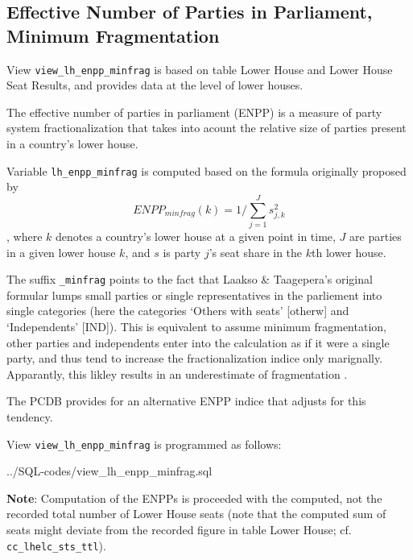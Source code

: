 \subsection{Effective Number of Parties in Parliament, Minimum Fragmentation}\label{view_lh_enpp_minfrag}
View \texttt{\footnotesize view\_lh\_enpp\_minfrag} is based on table Lower House and Lower House Seat Results, and provides data at the level of lower houses.

The effective number of parties in parliament (ENPP) is a measure of party system fractionalization that takes into acount the relative size of parties present in a country's lower house. 

Variable \texttt{\footnotesize lh\_enpp\_minfrag} is computed based on the formula originally proposed by \citet{Laakso&Taagepera1979}
\begin{equation}\label{ENPP_equ_minfrag}
ENPP_{minfrag}(k) = 1/\sum\limits_{j=1}^{J}s_{j,k}^{2}
\end{equation}
, where $k$ denotes a country's lower house at a given point in time, $J$ are parties in a given lower house $k$, and $s$ is party $j$'s seat share in the $k$th lower house. 

The suffix \texttt{\footnotesize \_minfrag} points to the fact that Laakso \& Taagepera's original formular lumps small parties or single representatives in the parliement into single categories (here the categories `Others with seats' [otherw] and `Independents' [IND]). 
This is equivalent to assume minimum fragmentation, other parties and independents enter into the calculation as if it were a single party, and thus tend to increase the fractionalization indice only marignally. Apparantly, this likley results in an underestimate of fragmentation \citep{Gallagher&Mitchell2005}.

The PCDB provides for an alternative ENPP indice that adjusts for this tendency.

View \texttt{\footnotesize view\_lh\_enpp\_minfrag} is programmed as follows:

%
{../SQL-codes/view_lh_enpp_minfrag.sql}

{\bf Note}: Computation of the ENPPs is proceeded with the computed, not the recorded total number of Lower House seats (note that the computed sum of seats might deviate from the recorded figure in table Lower House; cf. \texttt{\footnotesize cc\_lhelc\_sts\_ttl}).



